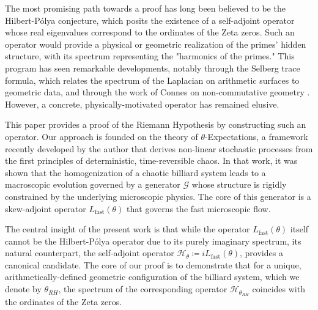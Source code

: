\documentclass[12pt, letterpaper]{amsart}
\theoremstyle{plain}
\theoremstyle{definition}
\theoremstyle{remark}
\newcommand{\Lfast}{L_{\text{fast}}}
\begin{document}
The most promising path towards a proof has long been believed to be the Hilbert-Pólya conjecture, which posits the existence of a self-adjoint operator whose real eigenvalues correspond to the ordinates of the Zeta zeros. Such an operator would provide a physical or geometric realization of the primes' hidden structure, with its spectrum representing the "harmonics of the primes." This program has seen remarkable developments, notably through the Selberg trace formula, which relates the spectrum of the Laplacian on arithmetic surfaces to geometric data, and through the work of Connes on non-commutative geometry \cite{Connes1999}. However, a concrete, physically-motivated operator has remained elusive.

This paper provides a proof of the Riemann Hypothesis by constructing such an operator. Our approach is founded on the theory of $\theta$-Expectations, a framework recently developed by the author \cite{Qi2025} that derives non-linear stochastic processes from the first principles of deterministic, time-reversible chaos. In that work, it was shown that the homogenization of a chaotic billiard system leads to a macroscopic evolution governed by a generator $\mathcal{G}$ whose structure is rigidly constrained by the underlying microscopic physics. The core of this generator is a skew-adjoint operator $\Lfast(\theta)$ that governs the fast microscopic flow.

The central insight of the present work is that while the operator $\Lfast(\theta)$ itself cannot be the Hilbert-Pólya operator due to its purely imaginary spectrum, its natural counterpart, the self-adjoint operator $\mathcal{H}_\theta \coloneqq i\Lfast(\theta)$, provides a canonical candidate. The core of our proof is to demonstrate that for a unique, arithmetically-defined geometric configuration of the billiard system, which we denote by $\theta_{RH}$, the spectrum of the corresponding operator $\mathcal{H}_{\theta_{RH}}$ coincides with the ordinates of the Zeta zeros.
\end{document}
